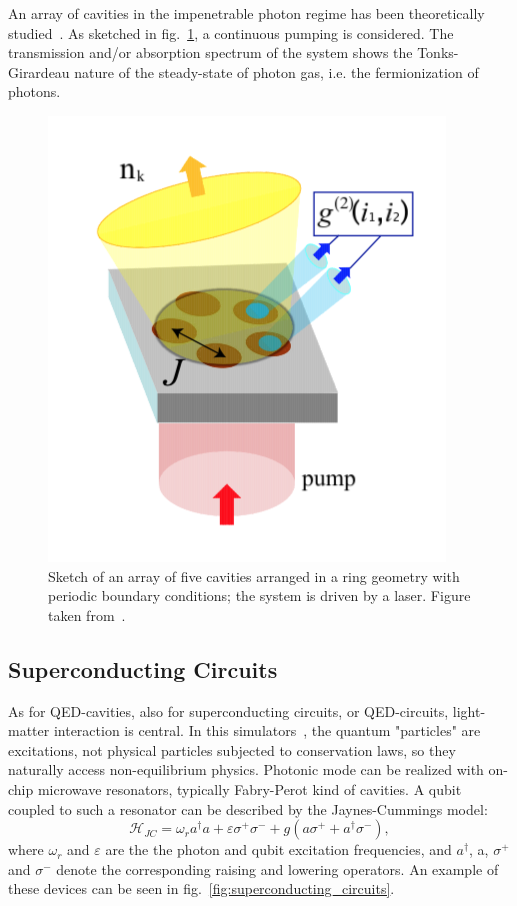 An array of cavities in the impenetrable photon regime has been theoretically studied~\cite{carusotto_ciuti}. As sketched in fig.~\ref{fig:cavities_ring}, a continuous pumping is considered. The transmission and/or absorption spectrum of the system shows the Tonks-Girardeau nature of the steady-state of photon gas, i.e. the fermionization of photons.

\begin{figure}
    \centering
    \includegraphics[scale=0.7]{Figures/cavities_ring.png}
    \captionsetup{width=1.\linewidth}
    \caption{Sketch of an array of five cavities arranged in a ring geometry with periodic boundary conditions; the system is driven by a laser. Figure taken from~\cite{carusotto_ciuti}.}
    \label{fig:cavities_ring}
\end{figure}


\subsection{Superconducting Circuits}
As for QED-cavities, also for superconducting circuits, or QED-circuits, light-matter interaction is central. In this simulators~\cite{supercircuitsQED}, the quantum "particles" are excitations, not physical particles subjected to conservation laws, so they naturally access non-equilibrium physics. Photonic mode can be realized with on-chip microwave resonators, typically Fabry-Perot kind of cavities. A qubit coupled to such a resonator can be described by the Jaynes-Cummings model:
\begin{equation}
    \mathcal{H}_{JC} = \omega_r a^{\dagger}a+ \varepsilon\sigma^+\sigma^- + g(a\sigma^+ + a^{\dagger}\sigma^-),
\end{equation}
where $\omega_r$ and $\varepsilon$ are the the photon and qubit excitation frequencies, and $a^{\dagger}$, a, $\sigma^+$ and $\sigma^-$ denote the corresponding raising and lowering operators. An example of these devices can be seen in fig.~\ref{fig:superconducting_circuits}.

